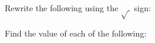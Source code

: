 \documentclass[12pt, a4paper, addpoints]{exam}
\newcommand{\ts}{\vspace{11mm}}
\begin{document}
\begin{questions}
\begin{multicols}{6}
\end{multicols}
\ts
\question Rewrite the following using the $\sqrt{\ }$ sign:

\begin{multicols}{6}
\end{multicols}

\question Find the value of each of the following:

\begin{multicols}{5}
\end{multicols}
\end{questions}
\end{document}
